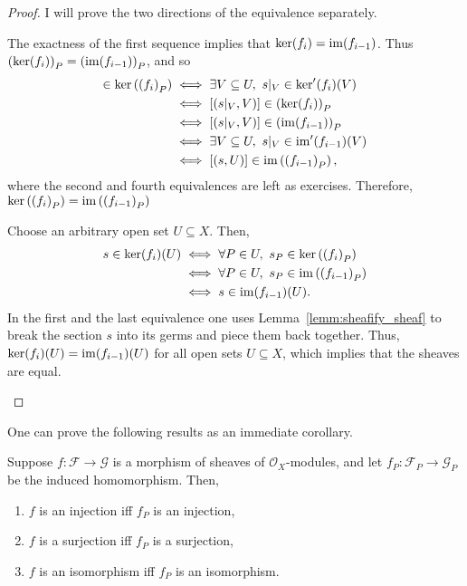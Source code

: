\begin{proof}
  I will prove the two directions of the equivalence separately.
  \begin{description}[style=nextline]
    \item[$\Longrightarrow\big)$]
          The exactness of the first sequence implies
          that $\ker(f_{i})=\operatorname{im}(f_{i-1})$. Thus $\left(\ker(f_{i})\right)_{P}
          =\left(\operatorname{im}(f_{i-1})\right)_{P}$, and so
          \begin{align*}
            [(s, U)]\in\ker\left(\left(f_{i}\right)_{P}\right)
            &\iff \exists V\subseteq U,\ s\vert_{V}\in\ker^{\prime}(f_{i})(V)\\
            &\iff [(s\vert_{V},V)]\in\left(\ker(f_{i})\right)_{P} \\
            &\iff [(s\vert_{V},V)]\in\left(\im(f_{i-1})\right)_{P} \\
            &\iff \exists V\subseteq U,\ s\vert_{V}\in
              \im^{\prime}(f_{i-1})(V) \\
            &\iff [(s,U)]\in\im\left(\left(f_{i-1}\right)_{P}\right),
          \end{align*}
          where the second and fourth equivalences are left as exercises.
          Therefore, $\ker\left(\left(f_{i}\right)_{P}\right)
          =\operatorname{im}\left(\left(f_{i-1}\right)_{P}\right)$
    \item[$\Longleftarrow\big)$]
          Choose an arbitrary open set $U\subseteq X$. Then,
          \begin{align*}
            s\in\ker(f_{i})(U)
            &\iff \forall P\in U,\ s_{P}\in\ker\left(\left(
              f_{i}\right)_{P}\right) \\
            &\iff \forall P\in U,\ s_{P}\in\operatorname{im}\left(\left(
              f_{i-1}\right)_{P}\right) \\
            &\iff s\in\operatorname{im}(f_{i-1})(U).
          \end{align*}
          In the first and the last equivalence one uses
          Lemma~\ref{lemm:sheafify_sheaf} to break the section $s$ into
          its germs and piece them back together. Thus,
          $\ker(f_{i})(U)=\operatorname{im}(f_{i-1})(U)$ for all open sets
          $U\subseteq X$, which implies that the sheaves are equal.
  \end{description}
\end{proof}
One can prove the following results as an immediate corollary.
\begin{cor}
  Suppose $f:\mathscr{F}\to\mathscr{G}$ is a morphism of sheaves of
  $\mathscr{O}_{X}$-modules, and let $f_{P}:\mathscr{F}_{P}\to\mathscr{G}_{P}$
  be the induced homomorphism. Then,
  \begin{enumerate}
    \item $f$ is an injection iff $f_{P}$ is an injection,
    \item $f$ is a surjection iff $f_{P}$ is a surjection,
    \item $f$ is an isomorphism iff $f_{P}$ is an isomorphism.
  \end{enumerate}
\end{cor}

